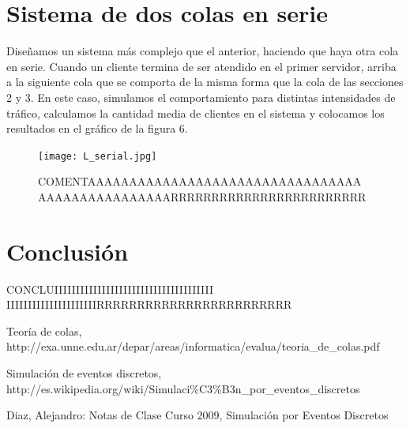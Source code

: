 \documentclass[10pt,journal,compsoc]{IEEEtran}
\begin{document}
\section{Sistema de dos colas en serie} %
Dise\~namos un sistema m\'as complejo que el anterior, haciendo que haya otra cola en serie. 
Cuando un cliente termina de ser atendido en el primer servidor, arriba a la siguiente cola
que se comporta de la misma forma que la cola de las secciones 2 y 3.
En este caso, simulamos el comportamiento para distintas intensidades de tr\'afico, calculamos
la cantidad media de clientes en el sistema y colocamos los resultados en el gr\'afico de la figura
6.

\begin{figure}[t]%
\label{fig:puntouno}
\begin{center}
\centering
\texttt{[image: L\_serial.jpg]}
\caption{COMENTAAAAAAAAAAAAAAAAAAAAAAAAAAAAAAAAA AAAAAAAAAAAAAAAARRRRRRRRRRRRRRRRRRRRRRRR}
\end{center}
\end{figure}


\section{Conclusi\'on}
CONCLUIIIIIIIIIIIIIIIIIIIIIIIIIIIIIIIIIIIII IIIIIIIIIIIIIIIIIIIIIRRRRRRRRRRRRRRRRRRRRRRRR


\begin{thebibliography}{1}

Teor\'ia de colas, http://exa.unne.edu.ar/depar/areas/informatica/evalua/teoria\_de\_colas.pdf

Simulaci\'on de eventos discretos, http://es.wikipedia.org/wiki/Simulaci\%C3\%B3n\_por\_eventos\_discretos

Diaz, Alejandro: Notas de Clase Curso 2009, Simulaci\'on por Eventos Discretos


\end{thebibliography}
\end{document}

